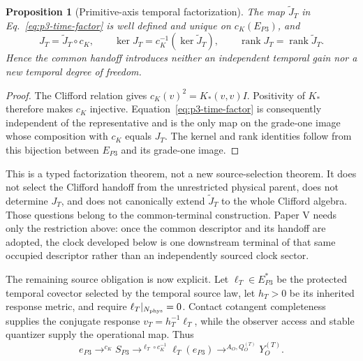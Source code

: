 \documentclass[11pt]{article}
\newtheorem{proposition}{Proposition}
\begin{document}
\begin{proposition}[Primitive-axis temporal factorization]
The map \(\widetilde J_T\) in Eq.~\eqref{eq:p3-time-factor} is well defined and
unique on \(c_K(E_{P3})\), and
\begin{equation}
 J_T=\widetilde J_T\circ c_K,
 \qquad
 \ker J_T=c_K^{-1}(\ker\widetilde J_T),
 \qquad
 \operatorname{rank}J_T=\operatorname{rank}\widetilde J_T.
 \label{eq:p3-time-rank-null}
\end{equation}
Hence the common handoff introduces neither an independent temporal gain nor
a new temporal degree of freedom.
\end{proposition}

\begin{proof}
The Clifford relation gives
\(c_K(v)^2=K_*(v,v)I\). Positivity of \(K_*\) therefore makes \(c_K\)
injective. Equation~\eqref{eq:p3-time-factor} is consequently independent of
the representative and is the only map on the grade-one image whose
composition with \(c_K\) equals \(J_T\). The kernel and rank identities follow
from this bijection between \(E_{P3}\) and its grade-one image.
\end{proof}

This is a typed factorization theorem, not a new source-selection theorem.
It does not select the Clifford handoff from the unrestricted physical parent,
does not determine \(J_T\), and does not canonically extend
\(\widetilde J_T\) to the whole Clifford algebra. Those questions belong to
the common-terminal construction. Paper V needs only the restriction above:
once the common descriptor and its handoff are adopted, the clock developed
below is one downstream terminal of that same occupied descriptor rather than
an independently sourced clock sector.

The remaining source obligation is now explicit. Let \(\ell_T\in E_{P3}^*\)
be the protected temporal covector selected by the temporal source law, let
\(h_T>0\) be its inherited response metric, and require
\(\ell_T|_{N_{\rm phys}}=0\). Contact cotangent completeness supplies the
conjugate response \(v_T=h_T^{-1}\ell_T\), while the observer access and stable
quantizer supply the operational map. Thus
\begin{equation}
 e_{P3}\mathrel{\mathop{\longrightarrow}^{c_K}}S_{P3}
 \mathrel{\mathop{\longrightarrow}^{\ell_T\circ c_K^{-1}}}\ell_T(e_{P3})
 \mathrel{\mathop{\longrightarrow}^{A_O,Q_O^{(T)}}}Y_O^{(T)}.
 \label{eq:source-to-time-spine}
\end{equation}
\end{document}

